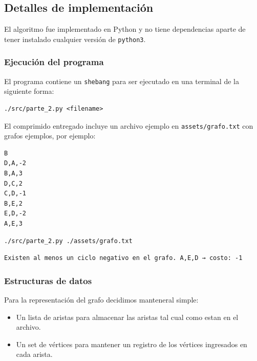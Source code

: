 \documentclass[titlepage,a4paper]{article}
\begin{document}
\subsection{Detalles de implementación}
\label{sec:org0882954}

El algoritmo fue implementado en Python y no tiene dependencias aparte de tener
instalado cualquier versión de \texttt{python3}.

\subsubsection{Ejecución del programa}
\label{sec:orgc63b9d2}

El programa contiene un \texttt{shebang} para ser ejecutado en una terminal de la
siguiente forma:

\begin{verbatim}
./src/parte_2.py <filename>
\end{verbatim}

El comprimido entregado incluye un archivo ejemplo en \texttt{assets/grafo.txt} con grafos ejemplos,
por ejemplo:

\begin{verbatim}
B
D,A,-2
B,A,3
D,C,2
C,D,-1
B,E,2
E,D,-2
A,E,3
\end{verbatim}

\begin{verbatim}
./src/parte_2.py ./assets/grafo.txt
\end{verbatim}

\begin{verbatim}
Existen al menos un ciclo negativo en el grafo. A,E,D → costo: -1
\end{verbatim}

\subsubsection{Estructuras de datos}
\label{sec:org19ab63e}

Para la representación del grafo decidimos manteneral simple:
\begin{itemize}
\item Un lista de aristas para almacenar las aristas tal cual como estan en el archivo.
\item Un set de vértices para mantener un registro de los vértices ingresados en
cada arista.
\end{itemize}

\pagebreak
\end{document}
